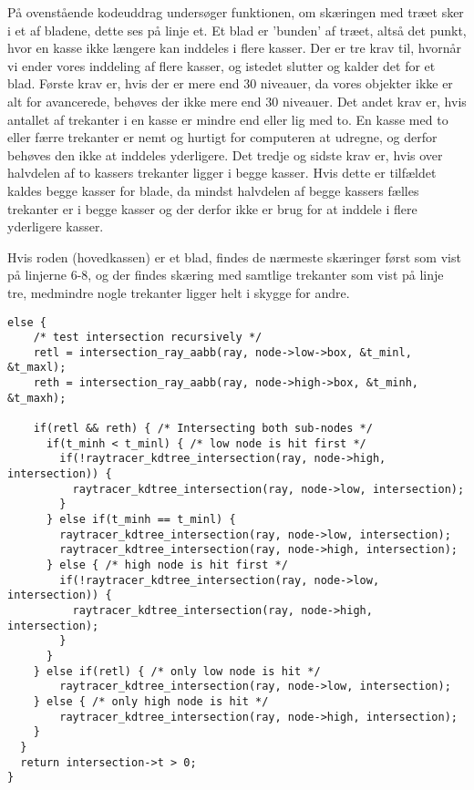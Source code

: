 På ovenstående kodeuddrag undersøger funktionen, om skæringen med træet sker i et af bladene, dette ses på linje et. Et blad er 'bunden' af træet, altså det punkt, hvor en kasse ikke længere kan inddeles i flere kasser. Der er tre krav til, hvornår vi ender vores inddeling af flere kasser, og istedet slutter og kalder det for et blad. Første krav er, hvis der er mere end 30 niveauer, da vores objekter ikke er alt for avancerede, behøves der ikke mere end 30 niveauer. Det andet krav er, hvis antallet af trekanter i en kasse er mindre end eller lig med to. En kasse med to eller færre trekanter er nemt og hurtigt for computeren at udregne, og derfor behøves den ikke at inddeles yderligere. Det tredje og sidste krav er, hvis over halvdelen af to kassers trekanter ligger i begge kasser. Hvis dette er tilfældet kaldes begge kasser for blade, da mindst halvdelen af begge kassers fælles trekanter er i begge kasser og der derfor ikke er brug for at inddele i flere yderligere kasser.

Hvis roden (hovedkassen) er et blad, findes de nærmeste skæringer først som vist på linjerne 6-8, og der findes skæring med samtlige trekanter som vist på linje tre, medmindre nogle trekanter ligger helt i skygge for andre. 

\begin{lstlisting}[style=Cstyle, caption=else (recursive)]
else {
    /* test intersection recursively */
    retl = intersection_ray_aabb(ray, node->low->box, &t_minl, &t_maxl);
    reth = intersection_ray_aabb(ray, node->high->box, &t_minh, &t_maxh);

    if(retl && reth) { /* Intersecting both sub-nodes */
      if(t_minh < t_minl) { /* low node is hit first */
        if(!raytracer_kdtree_intersection(ray, node->high, intersection)) {
          raytracer_kdtree_intersection(ray, node->low, intersection);
        }
      } else if(t_minh == t_minl) {
        raytracer_kdtree_intersection(ray, node->low, intersection);
        raytracer_kdtree_intersection(ray, node->high, intersection);
      } else { /* high node is hit first */
        if(!raytracer_kdtree_intersection(ray, node->low, intersection)) {
          raytracer_kdtree_intersection(ray, node->high, intersection);
        }
      }
    } else if(retl) { /* only low node is hit */
        raytracer_kdtree_intersection(ray, node->low, intersection);
    } else { /* only high node is hit */
        raytracer_kdtree_intersection(ray, node->high, intersection);
    }
  }
  return intersection->t > 0;
}
\end{lstlisting}

